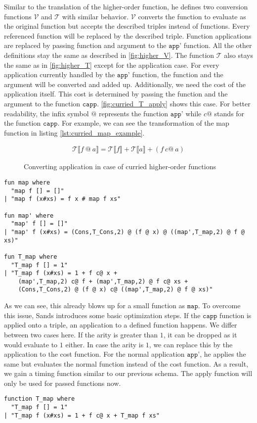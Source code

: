 Similar to the translation of the higher-order function, he defines two conversion functions $\mathcal{V}$ and $\mathcal{T}$ with similar behavior.
$\mathcal{V}$ converts the function to evaluate as the original function but accepts the described triples instead of functions.
Every referenced function will be replaced by the described triple.
Function applications are replaced by passing function and argument to the $\texttt{app'}$ function.
All the other definitions stay the same as described in \autoref{fig:higher_V}.
The function $\mathcal{T}$ also stays the same as in \autoref{fig:higher_T} except for the application case.
For every application currently handled by the $\texttt{app'}$ function, the function and the argument will be converted and added up.
Additionally, we need the cost of the application itself.
This cost is determined by passing the function and the argument to the function $\texttt{capp}$.
\autoref{fig:curried_T_apply} shows this case.
For better readability, the infix symbol $@$ represents the function $\texttt{app'}$ while $c@$ stands for the function $\texttt{capp}$.
For example, we can see the transformation of the map function in listing \ref{lst:curried_map_example}.
\begin{figure}
\begin{align*}
  \mathcal{T}\llbracket f\ @\ a\rrbracket = \mathcal{T}\llbracket f\rrbracket + \mathcal{T}\llbracket a\rrbracket + (f\ c@\ a)
\end{align*}
\caption{Converting application in case of curried higher-order functions}
\label{fig:curried_T_apply}
\end{figure}

\begin{lstlisting}[language=isabelle,mathescape=true,label=lst:curried_map_example,caption=Example translation for map function]
fun map where
  "map f [] = []"
| "map f (x#xs) = f x # map f xs"

fun map' where
  "map' f [] = []"
| "map' f (x#xs) = (Cons,T_Cons,2) @ (f @ x) @ ((map',T_map,2) @ f @ xs)"

fun T_map where
  "T_map f [] = 1"
| "T_map f (x#xs) = 1 + f c@ x +
    (map',T_map,2) c@ f + (map',T_map,2) @ f c@ xs +
    (Cons,T_Cons,2) @ (f @ x) c@ ((map',T_map,2) @ f @ xs)"
\end{lstlisting}

As we can see, this already blows up for a small function as $\texttt{map}$.
To overcome this issue, Sands introduces some basic optimization steps.
If the $\texttt{capp}$ function is applied onto a triple, an application to a defined function happens.
We differ between two cases here.
If the arity is greater than $1$, it can be dropped as it would evaluate to $1$ either.
In case the arity is $1$, we can replace this by the application to the cost function.
For the normal application $\texttt{app'}$, he applies the same but evaluates the normal function instead of the cost function.
As a result, we gain a timing function similar to our previous schema.
The apply function will only be used for passed functions now.
\begin{lstlisting}[language=isabelle,mathescape=true]
function T_map where
  "T_map f [] = 1"
| "T_map f (x#xs) = 1 + f c@ x + T_map f xs"
\end{lstlisting}
